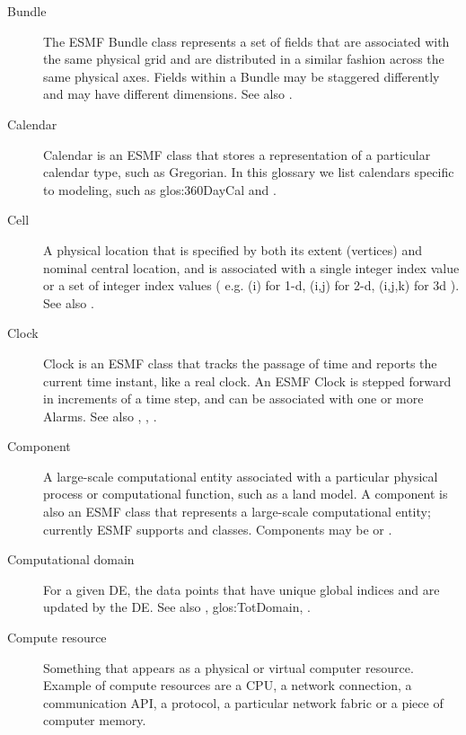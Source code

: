 \begin{description}
\label{glos:Bundle}
\item[Bundle] The ESMF Bundle class represents a set of fields that 
  are associated with the same physical grid and are distributed in a similar 
  fashion across the same physical axes.  Fields within a Bundle may be
  staggered differently and may have different dimensions. 
  See also . 

\label{glos:Calendar}
\item[Calendar] Calendar is an ESMF class that 
  stores a representation of a particular calendar type, such as Gregorian.
  In this glossary we list calendars specific to modeling, 
  such as 
  {glos:360DayCal} and .

\label{glos:Cell}
\item[Cell] A physical location that is specified by both 
  its extent (vertices) and nominal central location, and is associated with 
  a single integer index value or a set of integer index values ( e.g.
  (i) for 1-d, (i,j) for 2-d, (i,j,k) for 3d ). 
  See also .

\label{glos:Clock}
\item[Clock] Clock is an ESMF class that tracks the passage of time and 
  reports the current time instant, like a real clock.  An ESMF Clock 
  is stepped forward in increments of a time step, and can be associated
  with one or more Alarms.
  See also , , .

\label{glos:Component}
\item[Component] A large-scale computational entity 
  associated with a particular physical process or computational function, 
  such as a land model.  A component is also an ESMF class that represents
  a large-scale computational entity; currently ESMF supports  and  classes.
  Components may be  or 
  .  

\label{glos:CompDomain}
\item[Computational domain] For a given DE, the data points that 
  have unique global indices and are updated by the DE.  
  See also , 
  {glos:TotDomain}, .

\label{glos:CompResource}
\item[Compute resource] Something that appears as a
  physical or virtual computer resource. Example of compute resources
  are a CPU, a network connection, a communication API, a protocol, a 
  particular network fabric or a piece of computer memory. 


\end{description}
